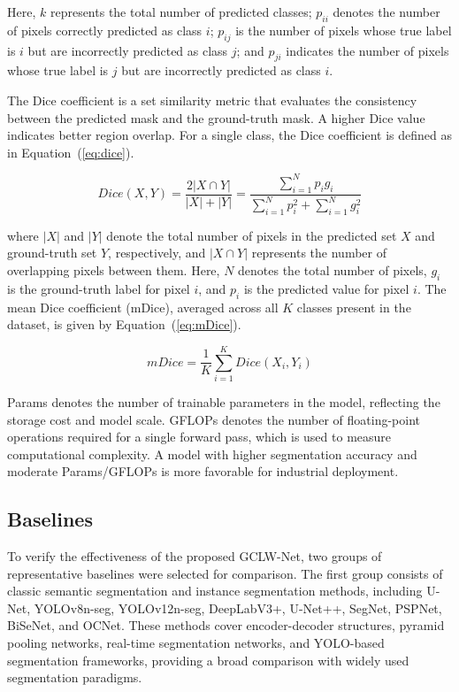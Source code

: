 \documentclass[sn-basic]{sn-jnl}
\theoremstyle{thmstyleone}%
\theoremstyle{thmstyletwo}%
\theoremstyle{thmstylethree}%
\begin{document}
Here, $k$ represents the total number of predicted classes; $p_{ii}$ denotes the number of pixels correctly predicted as class $i$; $p_{ij}$ is the number of pixels whose true label is $i$ but are incorrectly predicted as class $j$; and $p_{ji}$ indicates the number of pixels whose true label is $j$ but are incorrectly predicted as class $i$.

The Dice coefficient is a set similarity metric that evaluates the consistency between the predicted mask and the ground-truth mask. A higher Dice value indicates better region overlap. For a single class, the Dice coefficient is defined as in Equation~(\ref{eq:dice}).

\begin{equation}
Dice(X,Y) = \frac{2|X \cap Y|}{|X| + |Y|} = \frac{\sum_{i=1}^{N} p_i g_i}{\sum_{i=1}^{N} p_i^2 + \sum_{i=1}^{N} g_i^2}
\label{eq:dice}
\end{equation}

where $|X|$ and $|Y|$ denote the total number of pixels in the predicted set $X$ and ground-truth set $Y$, respectively, and $|X \cap Y|$ represents the number of overlapping pixels between them. Here, $N$ denotes the total number of pixels, $g_i$ is the ground-truth label for pixel $i$, and $p_i$ is the predicted value for pixel $i$. The mean Dice coefficient (mDice), averaged across all $K$ classes present in the dataset, is given by Equation~(\ref{eq:mDice}).

\begin{equation}
mDice = \frac{1}{K} \sum_{i=1}^{K} Dice(X_i, Y_i)
\label{eq:mDice}
\end{equation}

Params denotes the number of trainable parameters in the model, reflecting the storage cost and model scale. GFLOPs denotes the number of floating-point operations required for a single forward pass, which is used to measure computational complexity. A model with higher segmentation accuracy and moderate Params/GFLOPs is more favorable for industrial deployment.

\subsection{Baselines}
To verify the effectiveness of the proposed GCLW-Net, two groups of representative baselines were selected for comparison. The first group consists of classic semantic segmentation and instance segmentation methods, including U-Net, YOLOv8n-seg, YOLOv12n-seg, DeepLabV3+, U-Net++, SegNet, PSPNet, BiSeNet, and OCNet. These methods cover encoder-decoder structures, pyramid pooling networks, real-time segmentation networks, and YOLO-based segmentation frameworks, providing a broad comparison with widely used segmentation paradigms.
\end{document}

